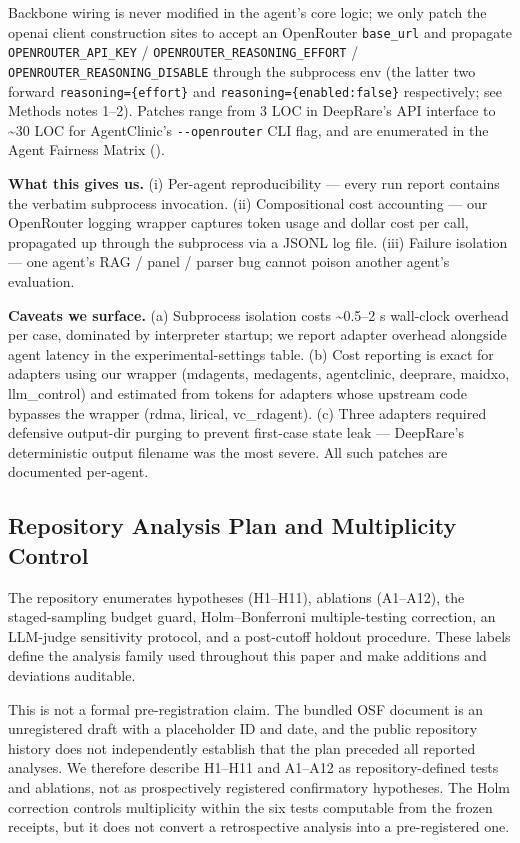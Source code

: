 Backbone wiring is never modified in the agent's core logic; we only
patch the openai client construction sites to accept an OpenRouter
\texttt{base\_url} and propagate \texttt{OPENROUTER\_API\_KEY} /
\texttt{OPENROUTER\_REASONING\_EFFORT} / \texttt{OPENROUTER\_REASONING\_DISABLE} through the
subprocess env (the latter two forward \texttt{reasoning=\{effort\}} and
\texttt{reasoning=\{enabled:false\}} respectively; see Methods notes 1--2). Patches range
from 3 LOC in DeepRare's API interface to \textasciitilde30 LOC for AgentClinic's \texttt{-\/-openrouter}
CLI flag, and are enumerated in the Agent Fairness Matrix ().

\textbf{What this gives us.} (i) Per-agent reproducibility --- every run report
contains the verbatim subprocess invocation. (ii) Compositional cost
accounting --- our OpenRouter logging wrapper
captures token usage and dollar cost per call, propagated up through the
subprocess via a JSONL log file. (iii) Failure isolation --- one agent's
RAG / panel / parser bug cannot poison another agent's evaluation.

\textbf{Caveats we surface.} (a) Subprocess isolation costs \textasciitilde0.5--2 s wall-clock
overhead per case, dominated by interpreter startup; we report adapter
overhead alongside agent latency in the experimental-settings table. (b) Cost reporting is exact for
adapters using our wrapper (mdagents, medagents, agentclinic, deeprare,
maidxo, llm\_control) and estimated from tokens for adapters whose
upstream code bypasses the wrapper (rdma, lirical, vc\_rdagent). (c) Three adapters required
defensive output-dir purging to prevent first-case state leak --- DeepRare's
deterministic output filename was the most severe. All such patches are documented per-agent.

\subsection{Repository Analysis Plan and Multiplicity Control}\label{sec-5-4}

The repository enumerates hypotheses (H1--H11), ablations
(A1--A12), the staged-sampling budget guard, Holm--Bonferroni
multiple-testing correction, an LLM-judge sensitivity protocol, and a
post-cutoff holdout procedure. These labels define the analysis family used
throughout this paper and make additions and deviations auditable.

This is not a formal pre-registration claim. The bundled OSF document is
an unregistered draft with a placeholder ID and date, and the public
repository history does not independently establish that the plan preceded
all reported analyses. We therefore describe H1--H11 and A1--A12 as
repository-defined tests and ablations, not as prospectively registered
confirmatory hypotheses. The Holm correction controls multiplicity within
the six tests computable from the frozen receipts, but it does not convert a
retrospective analysis into a pre-registered one.

